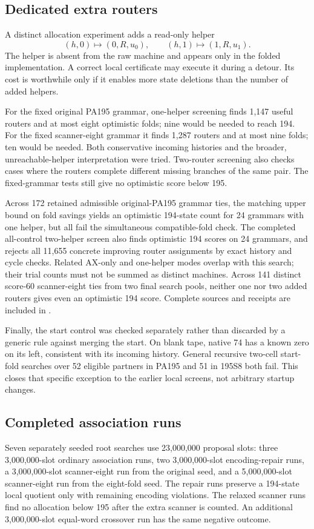\subsection{Dedicated extra routers}
A distinct allocation experiment adds a read-only helper
\[
 (h,0)\mapsto(0,R,u_0),\qquad
 (h,1)\mapsto(1,R,u_1).
\]
The helper is absent from the raw machine and appears only in the folded
implementation. A correct local certificate may execute it during a
detour. Its cost is worthwhile only if it enables more state deletions
than the number of added helpers.

For the fixed original PA195 grammar, one-helper screening finds 1,147
useful routers and at most eight optimistic folds; nine would be needed
to reach 194. For the fixed scanner-eight grammar it finds 1,287 routers
and at most nine folds; ten would be needed. Both conservative incoming
histories and the broader, unreachable-helper interpretation were tried.
Two-router screening also checks cases where the routers complete
different missing branches of the same pair. The fixed-grammar tests
still give no optimistic score below 195.

Across 172 retained admissible original-PA195 grammar ties, the
matching upper bound on fold savings yields an optimistic 194-state
count for 24 grammars with one helper, but all fail the simultaneous
compatible-fold check. The completed all-control two-helper screen
also finds optimistic 194 scores on 24 grammars, and rejects all
11,655 concrete improving router assignments by exact history and
cycle checks. Related AX-only and one-helper modes overlap with
this search; their trial counts must not be summed as distinct machines.
Across 141 distinct score-60
scanner-eight ties from two final search pools, neither one nor two
added routers gives even an optimistic 194 score. Complete sources and
receipts are included in .

Finally, the start control was checked separately rather than discarded
by a generic rule against merging the start. On blank tape, native 74
has a known zero on its left, consistent with its incoming history.
General recursive two-cell start-fold searches over 52 eligible
partners in PA195 and 51 in 195S8 both fail. This closes that specific
exception to the earlier local screens, not arbitrary startup changes.

\subsection{Completed association runs}
Seven separately seeded root searches use 23,000,000 proposal slots:
three 3,000,000-slot ordinary association runs, two 3,000,000-slot
encoding-repair runs, a 3,000,000-slot scanner-eight run from the
original seed, and a 5,000,000-slot scanner-eight run from the
eight-fold seed. The repair runs preserve a 194-state local quotient
only with remaining encoding violations. The relaxed scanner runs
find no allocation below 195 after the extra scanner is counted.
An additional 3,000,000-slot equal-word crossover run has the same
negative outcome.


